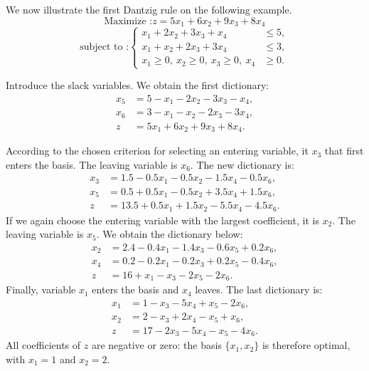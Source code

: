 \begin{example}
    We now illustrate the first Dantzig rule on the following example.
    \[
        \text{Maximize :} z = 5x_1 + 6x_2 + 9x_3 + 8x_4
    \]
    \[
        \text{subject to :}
        \left\{
        \begin{aligned}
        x_1 + 2x_2 + 3x_3 + x_4 &\leqslant 5,\\
        x_1 + x_2 + 2x_3 + 3x_4 &\leqslant 3,\\
        x_1 \ge 0,\ x_2 \ge 0,\ x_3 \ge 0,\ x_4 &\ge 0.
        \end{aligned}
        \right.
    \]

    Introduce the slack variables. We obtain the first dictionary:
    \[
        \begin{aligned}
        x_5 &= 5 - x_1 - 2x_2 - 3x_3 - x_4,\\
        x_6 &= 3 - x_1 - x_2 - 2x_3 - 3x_4,\\
        \hline
        z &= 5x_1 + 6x_2 + 9x_3 + 8x_4.
        \end{aligned}
    \]

    According to the chosen criterion for selecting an entering variable, it \(x_3\) that first enters the basis. The leaving variable is \(x_6\). The new dictionary is:
    \[
        \begin{aligned}
        x_3 &= 1.5 - 0.5x_1 - 0.5x_2 - 1.5x_4 - 0.5x_6,\\
        x_5 &= 0.5 + 0.5x_1 - 0.5x_2 + 3.5x_4 + 1.5x_6,\\
        \hline
        z &= 13.5 + 0.5x_1 + 1.5x_2 - 5.5x_4 - 4.5x_6.
        \end{aligned}
    \]
    If we again choose the entering variable with the largest coefficient, it is \(x_2\). The leaving variable is \(x_5\). We obtain the dictionary below:
    \[
        \begin{aligned}
        x_2 &= 2.4 - 0.4x_1 - 1.4x_3 - 0.6x_5 + 0.2x_6,\\
        x_4 &= 0.2 - 0.2x_1 - 0.2x_3 + 0.2x_5 - 0.4x_6,\\
        \hline
        z &= 16 + x_1 - x_3 - 2x_5 - 2x_6.
        \end{aligned}
    \]
    Finally, variable \(x_1\) enters the basis and \(x_4\) leaves. The last dictionary is:
    \[
        \begin{aligned}
        x_1 &= 1 - x_3 - 5x_4 + x_5 - 2x_6,\\
        x_2 &= 2 - x_3 + 2x_4 - x_5 + x_6,\\
        z &= 17 - 2x_3 - 5x_4 - x_5 - 4x_6.
        \end{aligned}
    \]
    All coefficients of \(z\) are negative or zero: the basis \(\{x_1,x_2\}\) is therefore optimal, with \(x_1=1\) and \(x_2=2\).
\end{example}

